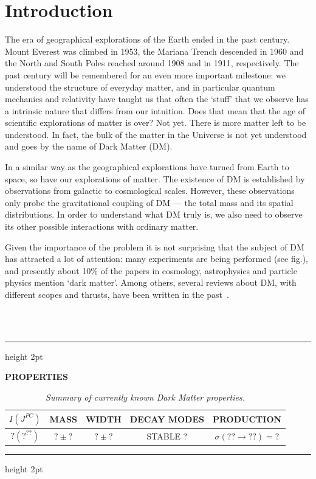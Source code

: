 \chapter*{Introduction}\label{Introduction}

The era of geographical explorations of the Earth ended in the past century. 
Mount Everest was  climbed in 1953, the Mariana Trench descended in 1960 and the North and South  Poles reached around 1908 and in 1911, respectively.
The past century will be remembered for an even more important milestone: we understood the structure of everyday matter, and in particular quantum mechanics and relativity have taught us that often the `stuff' that we observe has a intrinsic nature that differs from our intuition.
Does that mean that the age of scientific explorations of matter is over? 
Not yet.
There is more matter left to be understood. In fact, the bulk of the matter in the Universe is not yet understood  and goes by the name of Dark Matter (DM).

In a similar way as the geographical explorations have turned from Earth to space, so have our explorations of matter. 
The existence of DM is established by observations from galactic to cosmological scales.
However, these observations only probe the gravitational coupling of DM --- the total mass and its spatial distributions.
In order to understand what DM truly is, 
we also need to observe its other possible interactions with ordinary matter.

Given the importance of the problem it is not surprising that the subject of DM has attracted a lot of attention:
many experiments are being performed (see fig.), and
presently about 10\% of the papers in cosmology, astrophysics and 
particle physics mention `dark matter'. 
Among others, several reviews about DM, with different scopes and thrusts, have been written in the past~\cite{otherpastDMreviews}.



\begin{table}[b]
\begin{center}\color{black}
\parbox{0.75\textwidth}{\fboxrule=3pt
 \\
\medskip
{} \\
\medskip
\hrule height 2pt
\medskip\centerline{\Large\bf PROPERTIES}
\begin{tabular}{ccccc}
\small  $I (J^{PC}) $ & \small MASS &\small  WIDTH & \small DECAY MODES & \small PRODUCTION\\ \hline
 $?(?^{??})$& ${?} \pm {?}$ & ${?} \pm {?}$ &  STABLE ? &   $\sigma({??}\to {??})={?}$
\end{tabular}
\hrule height 2pt}
\end{center}
\caption[DM summary]{\em Summary of currently known Dark Matter properties.  \label{tab:DMsummary}}
\end{table}


